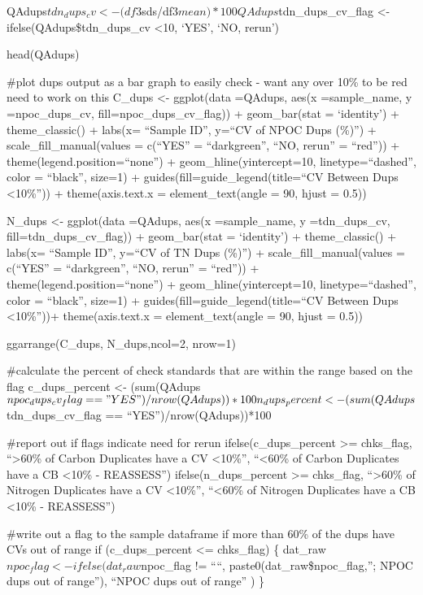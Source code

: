 \documentclass[
]{article}
\begin{document}
QAdups\(tdn_dups_cv <- (df3\)sds/df3\(mean) * 100 QAdups\)tdn\_dups\_cv\_flag
\textless- ifelse(QAdups\$tdn\_dups\_cv \textless10, `YES', `NO, rerun')

head(QAdups)

\#plot dups output as a bar graph to easily check - want any over 10\%
to be red need to work on this C\_dups \textless- ggplot(data =QAdups,
aes(x =sample\_name, y =npoc\_dups\_cv, fill=npoc\_dups\_cv\_flag)) +
geom\_bar(stat = `identity') + theme\_classic() + labs(x= ``Sample ID'',
y=``CV of NPOC Dups (\%)'') + scale\_fill\_manual(values = c(``YES'' =
``darkgreen'', ``NO, rerun'' = ``red'')) +
theme(legend.position=``none'') + geom\_hline(yintercept=10,
linetype=``dashed'', color = ``black'', size=1) +
guides(fill=guide\_legend(title=``CV Between Dups \textless10\%'')) +
theme(axis.text.x = element\_text(angle = 90, hjust = 0.5))

N\_dups \textless- ggplot(data =QAdups, aes(x =sample\_name, y
=tdn\_dups\_cv, fill=tdn\_dups\_cv\_flag)) + geom\_bar(stat =
`identity') + theme\_classic() + labs(x= ``Sample ID'', y=``CV of TN
Dups (\%)'') + scale\_fill\_manual(values = c(``YES'' = ``darkgreen'',
``NO, rerun'' = ``red'')) + theme(legend.position=``none'') +
geom\_hline(yintercept=10, linetype=``dashed'', color = ``black'',
size=1) + guides(fill=guide\_legend(title=``CV Between Dups
\textless10\%''))+ theme(axis.text.x = element\_text(angle = 90, hjust =
0.5))

ggarrange(C\_dups, N\_dups,ncol=2, nrow=1)

\#calculate the percent of check standards that are within the range
based on the flag c\_dups\_percent \textless-
(sum(QAdups\(npoc_dups_cv_flag == "YES")/nrow(QAdups))*100 n_dups_percent <- (sum(QAdups\)tdn\_dups\_cv\_flag
== ``YES'')/nrow(QAdups))*100

\#report out if flags indicate need for rerun ifelse(c\_dups\_percent
\textgreater= chks\_flag, ``\textgreater60\% of Carbon Duplicates have a
CV \textless10\%'', ``\textless60\% of Carbon Duplicates have a CB
\textless10\% - REASSESS'') ifelse(n\_dups\_percent \textgreater=
chks\_flag, ``\textgreater60\% of Nitrogen Duplicates have a CV
\textless10\%'', ``\textless60\% of Nitrogen Duplicates have a CB
\textless10\% - REASSESS'')

\#write out a flag to the sample dataframe if more than 60\% of the dups
have CVs out of range if (c\_dups\_percent \textless= chks\_flag) \{
dat\_raw\(npoc_flag <- ifelse(  dat_raw\)npoc\_flag != ````,
paste0(dat\_raw\$npoc\_flag,''; NPOC dups out of range''), ``NPOC dups
out of range'' ) \}
\end{document}
